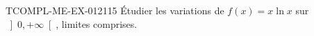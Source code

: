 \begin{exercice}{TCOMPL-ME-EX-012}{1}{15}
Étudier les variations de $f(x) = x\ln x$ sur $\left]0, +\infty\right[$, limites comprises.

\end{exercice}
